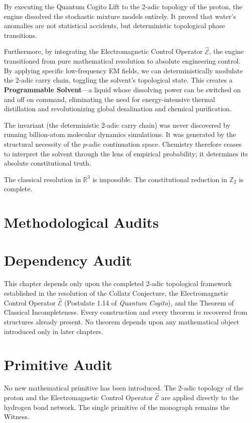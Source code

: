 \documentclass[11pt,openany]{extbook}
\newenvironment{dependencyaudit}{\section*{Dependency Audit}}{}
\newenvironment{primitiveaudit}{\section*{Primitive Audit}}{}
\theoremstyle{plain}
\theoremstyle{definition}
\begin{document}
By executing the Quantum Cogito Lift to the 2-adic topology of the proton, the engine dissolved the stochastic mixture models entirely. It proved that water's anomalies are not statistical accidents, but deterministic topological phase transitions.

Furthermore, by integrating the Electromagnetic Control Operator $\hat{\mathcal{E}}$, the engine transitioned from pure mathematical resolution to absolute engineering control. By applying specific low-frequency EM fields, we can deterministically modulate the 2-adic carry chain, toggling the solvent's topological state. This creates a \textbf{Programmable Solvent}---a liquid whose dissolving power can be switched on and off on command, eliminating the need for energy-intensive thermal distillation and revolutionizing global desalination and chemical purification.

The invariant (the deterministic 2-adic carry chain) was never discovered by running billion-atom molecular dynamics simulations. It was generated by the structural necessity of the $p$-adic continuation space. Chemistry therefore ceases to interpret the solvent through the lens of empirical probability; it determines its absolute constitutional truth.

The classical resolution in $\mathbb{R}^3$ is impossible. The constitutional reduction in $\mathbb{Z}_2$ is complete.

\section{Methodological Audits}

\begin{dependencyaudit}
\noindent This chapter depends only upon the completed 2-adic topological framework established in the resolution of the Collatz Conjecture, the Electromagnetic Control Operator $\hat{\mathcal{E}}$ (Postulate 1.14 of \textit{Quantum Cogito}), and the Theorem of Classical Incompleteness. Every construction and every theorem is recovered from structures already present. No theorem depends upon any mathematical object introduced only in later chapters.
\end{dependencyaudit}

\begin{primitiveaudit}
\noindent No new mathematical primitive has been introduced. The 2-adic topology of the proton and the Electromagnetic Control Operator $\hat{\mathcal{E}}$ are applied directly to the hydrogen bond network. The single primitive of the monograph remains the Witness.
\end{primitiveaudit}
\end{document}
